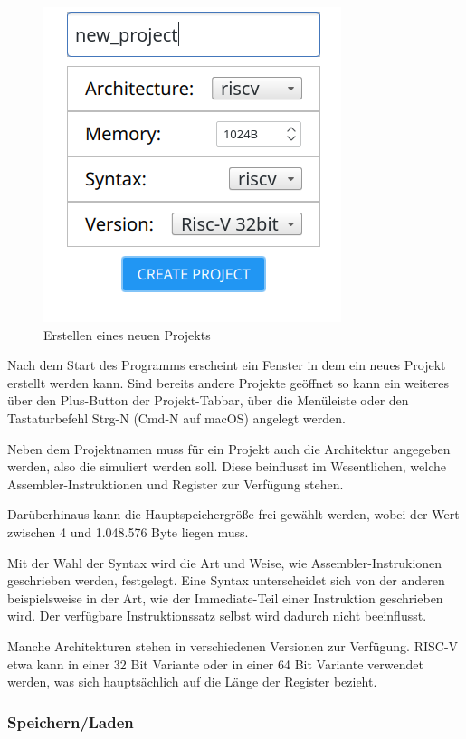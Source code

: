 \begin{figure}[ht]
	\centering
  \includegraphics[scale=1]{Images/create_new_project}
	\caption{Erstellen eines neuen Projekts}
	\label{Project_Creation}
\end{figure}

Nach dem Start des Programms erscheint ein Fenster in dem ein neues Projekt erstellt werden kann. Sind bereits andere Projekte geöffnet so kann ein weiteres über den Plus-Button der Projekt-Tabbar, über die Menüleiste oder den Tastaturbefehl Strg-N (Cmd-N auf macOS) angelegt werden.

Neben dem Projektnamen muss für ein Projekt auch die Architektur angegeben werden, also die simuliert werden soll. Diese beinflusst im Wesentlichen, welche Assembler-Instruktionen und Register zur Verfügung stehen.

Darüberhinaus kann die Hauptspeichergröße frei gewählt werden, wobei der Wert zwischen 4 und 1.048.576 Byte liegen muss.

Mit der Wahl der Syntax wird die Art und Weise, wie Assembler-Instrukionen geschrieben werden, festgelegt. Eine Syntax unterscheidet sich von der anderen beispielsweise in der Art, wie der Immediate-Teil einer Instruktion geschrieben wird. Der verfügbare Instruktionssatz selbst wird dadurch nicht beeinflusst.

Manche Architekturen stehen in verschiedenen Versionen zur Verfügung. RISC-V etwa kann in einer 32 Bit Variante oder in einer 64 Bit Variante verwendet werden, was sich hauptsächlich auf die Länge der Register bezieht.


\subsubsection{Speichern/Laden}

